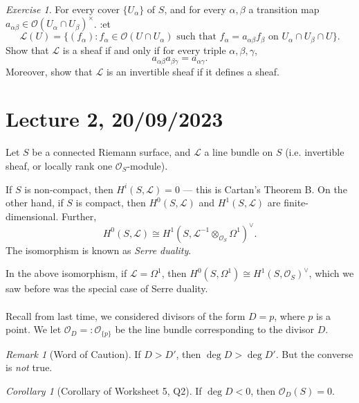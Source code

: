 \documentclass[a4paper]{report}
\theoremstyle{definition}
\theoremstyle{remark}
\newtheorem{remark}{Remark}
\theoremstyle{proposition}
\theoremstyle{conjecture}
\theoremstyle{lemma}
\theoremstyle{corollary}
\newtheorem{corollary}{Corollary}
\theoremstyle{exercise}
\newtheorem{exercise}{Exercise}
\theoremstyle{example}
\newcommand{\mcal}{\mathcal}
\begin{document}
\begin{exercise}
    For every cover $\lbrace U_\alpha\rbrace$ of $S$, and 
    for every $\alpha,\beta$ a transition map $a_{\alpha\beta}\in\mcal{O}(U_\alpha\cap U_\beta)^\times$. :et 
    $$\mcal{L}(U) = \lbrace (f_\alpha) : \text{$f_\alpha \in \mcal{O}(U \cap U_\alpha)$ such that $f_\alpha = a_{\alpha\beta}f_\beta$ on $U_\alpha\cap U_\beta\cap U$}\rbrace.$$
    Show that $\mcal{L}$ is a sheaf if and only if for every triple 
    $\alpha,\beta,\gamma$, 
    $$a_{\alpha\beta}a_{\beta\gamma} = a_{\alpha\gamma}.$$
    Moreover, show that $\mcal{L}$ is an invertible sheaf if it defines a 
    sheaf.
\end{exercise}



\section{Lecture 2, 20/09/2023}

Let $S$ be a connected Riemann surface, and $\mcal{L}$ a line 
bundle on $S$ (i.e. invertible sheaf, or locally rank one $\mcal{O}_S$-module).

\begin{theorem}
    If $S$ is non-compact, then $H^i(S,\mcal{L}) = 0$ --- this is 
    Cartan's Theorem B. On the other hand, if $S$ is compact, then $H^0(S,\mcal{L})$
    and $H^1(S,\mcal{L})$ are finite-dimensional. Further,
    $$H^0(S,\mcal{L}) \cong H^1(S,\mcal{L}^{-1} \otimes_{\mcal{O}_S}\Omega^1)^\vee.$$
    The isomorphism is known as \emph{Serre duality}.
\end{theorem}

In the above isomorphism, if $\mcal{L} = \Omega^1$, then 
$H^0(S,\Omega^1) \cong H^1(S,\mcal{O}_S)^\vee$, which we saw before 
was the special case of Serre duality.\\\\
Recall from last time, we considered divisors of the form $D = p$,
where $p$ is a point. We let $\mcal{O}_D =: \mcal{O}_{\lbrace p\rbrace}$
be the line bundle corresponding to the divisor $D$.

\begin{remark}[Word of Caution]
    If $D > D'$, then $\deg D > \deg D'$. But the converse is \emph{not} true.
\end{remark}

\begin{corollary}[Corollary of Worksheet 5, Q2]
    If $\deg D < 0$, then $\mcal{O}_D(S) = 0$.
\end{corollary}
\end{document}
